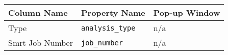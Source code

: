 \begin{tabularx}{\textwidth}{l|l|X}
\toprule
 Column Name     & Property Name   & Pop-up Window   \\
\midrule
 Type            & \texttt{analysis\_type}   & n/a             \\
 Smrt Job Number & \texttt{job\_number}      & n/a             \\
\bottomrule
\end{tabularx}